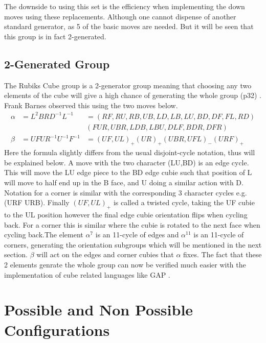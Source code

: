 \documentclass{article}
\newcounter{lem}[section]\setcounter{lem}{0}
\begin{document}
The downside to using this set is the efficiency when implementing the down moves using these replacements. Although one cannot dispense of  another standard generator, as 5 of the basic moves are needed. But it will be seen that this group is in fact 2-generated.

\subsection{2-Generated Group}

The Rubiks Cube group is a 2-generator group meaning that choosing any two elements of the cube will give a high chance of generating the whole group (p32) \cite{Magic}. Frank Barnes observed this using the two moves below.
\begin{align*}
\alpha &= L^{2}BRD^{-1}L^{-1} &= (RF,RU,RB,UB,LD,LB,LU,BD,DF,FL,RD)\\& &(FUR,UBR,LDB,LBU,DLF,BDR,DFR) \\
\beta &= UFUR^{-1}U^{-1}F^{-1} &= (UF,UL)_{+}(UR)_{+}(UBR,UFL)_{-}(URF)_{+} 
\end{align*}
Here the formula slightly differs from the usual disjoint-cycle notation, thus will be explained below. A move with the two character (LU,BD) is an edge cycle. This will move the LU edge piece to the BD edge cubie such that position of L will move to half end up in the B face, and U doing a similar action with D. Notation for a corner is similar with the corresponding 3 character cycles e.g. (URF URB). Finally $(UF,UL)_{+}$ is called a twisted cycle, taking the UF cubie to the UL position however the final edge cubie orientation flips when cycling back. For a corner this is similar where the cubie is rotated to the next face when cycling back.\newline The element $\alpha^{7}$ is an 11-cycle of edges and $\alpha^{11}$ is an 11-cycle of corners, generating the orientation subgroups which will be mentioned in the next section. $\beta$ will act on the edges and corner cubies that $\alpha$ fixes. The fact that these 2 elements genrate the whole group can now be verified much easier with the implementation of cube related languages like GAP \cite{GAP}.




\pagebreak
\section{Possible and Non Possible Configurations}
\end{document}
